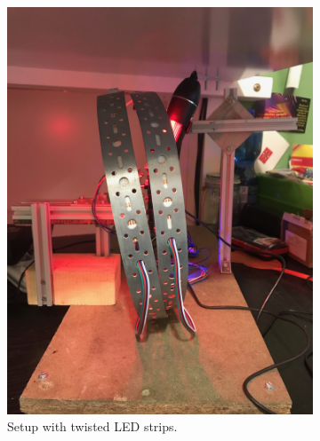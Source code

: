 \begin{figure}[hbtp]
\centering
	\hspace*{\fill}
	\begin{subfigure}{0.4\textwidth}
		\includegraphics[width=\linewidth, keepaspectratio=true, angle=270]{./fig/Vision/Dataset/automated_datasets/2_created_datasets/2_Spaghetti_dataset/IMG_9295.jpeg}
		\caption{Setup with twisted LED strips.}
		\label{fig:impl:dataset:spaghetti:ledstrips}
	\end{subfigure}
	\hspace*{\fill}
	\begin{subfigure}{0.4\textwidth}

\end{subfigure}
\end{figure}
